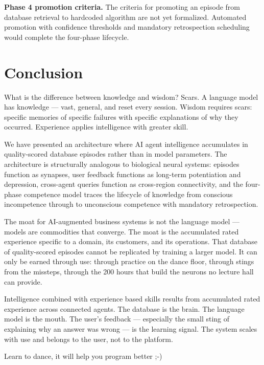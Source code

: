 \documentclass[11pt,a4paper]{article}
\begin{document}
\textbf{Phase 4 promotion criteria.} The criteria for promoting an episode from database retrieval to hardcoded algorithm are not yet formalized. Automated promotion with confidence thresholds and mandatory retrospection scheduling would complete the four-phase lifecycle.

\section{Conclusion}

What is the difference between knowledge and wisdom? Scars. A language model has knowledge --- vast, general, and reset every session. Wisdom requires scars: specific memories of specific failures with specific explanations of why they occurred. Experience applies intelligence with greater skill.

We have presented an architecture where AI agent intelligence accumulates in quality-scored database episodes rather than in model parameters. The architecture is structurally analogous to biological neural systems: episodes function as synapses, user feedback functions as long-term potentiation and depression, cross-agent queries function as cross-region connectivity, and the four-phase competence model traces the lifecycle of knowledge from conscious incompetence through to unconscious competence with mandatory retrospection.

The moat for AI-augmented business systems is not the language model --- models are commodities that converge. The moat is the accumulated rated experience specific to a domain, its customers, and its operations. That database of quality-scored episodes cannot be replicated by training a larger model. It can only be earned through use: through practice on the dance floor, through stings from the missteps, through the 200 hours that build the neurons no lecture hall can provide.

Intelligence combined with experience based skills results from accumulated rated experience across connected agents. The database is the brain. The language model is the mouth. The user's feedback --- especially the small sting of explaining why an answer was wrong --- is the learning signal. The system scales with use and belongs to the user, not to the platform.

Learn to dance, it will help you program better ;-)


\end{document}
